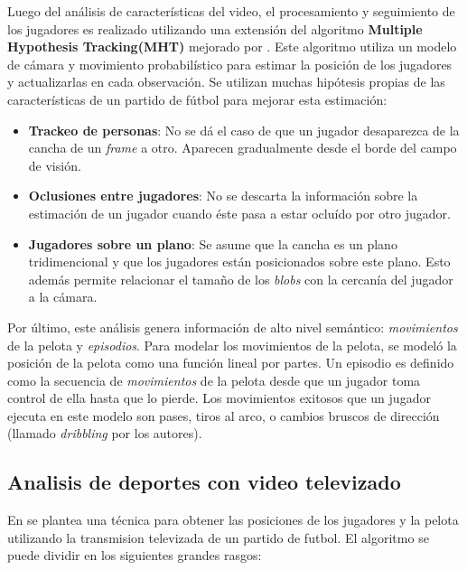 \documentclass[a4paper,10pt]{article}
\begin{document}
Luego del análisis de características del video, el procesamiento y seguimiento
de los jugadores es realizado utilizando una extensión del algoritmo
\textbf{Multiple Hypothesis Tracking(MHT)} \cite{MHT-1, MHT-2} mejorado por
\citeauthor*{Schmitt-1}\cite{Schmitt-2}. Este algoritmo utiliza un modelo de
cámara y movimiento probabilístico para estimar la posición de los jugadores y
actualizarlas en cada observación. Se utilizan muchas hipótesis propias de las
características de un partido de fútbol para mejorar esta estimación:

\begin{itemize}
  \item \textbf{Trackeo de personas}: No se dá el caso de que un jugador
    desaparezca de la cancha de un \textit{frame} a otro. Aparecen gradualmente
    desde el borde del campo de visión.

  \item \textbf{Oclusiones entre jugadores}: No se descarta la información
    sobre la estimación de un jugador cuando éste pasa a estar ocluído por otro
    jugador.

  \item \textbf{Jugadores sobre un plano}: Se asume que la cancha es un plano
    tridimencional y que los jugadores están posicionados sobre este plano.
    Esto además permite relacionar el tamaño de los \textit{blobs} con la
    cercanía del jugador a la cámara.

\end{itemize}

Por último, este análisis genera información de alto nivel semántico:
\textit{movimientos} de la pelota y \textit{episodios}. Para modelar los
movimientos de la pelota, se modeló la posición de la pelota como una función
lineal por partes. Un episodio es definido como la secuencia de
\textit{movimientos} de la pelota desde que un jugador toma control de ella
hasta que lo pierde. Los movimientos exitosos que un jugador ejecuta en este
modelo son pases, tiros al arco, o cambios bruscos de dirección (llamado
\textit{dribbling} por los autores).

\subsection{Analisis de deportes con video televizado}
\label{sec:tv-video}

En \cite{LIU20061146} se plantea una técnica para obtener las posiciones de los
jugadores y la pelota utilizando la transmision televizada de un partido de
futbol. El algoritmo se puede dividir en los siguientes grandes rasgos:
\end{document}
